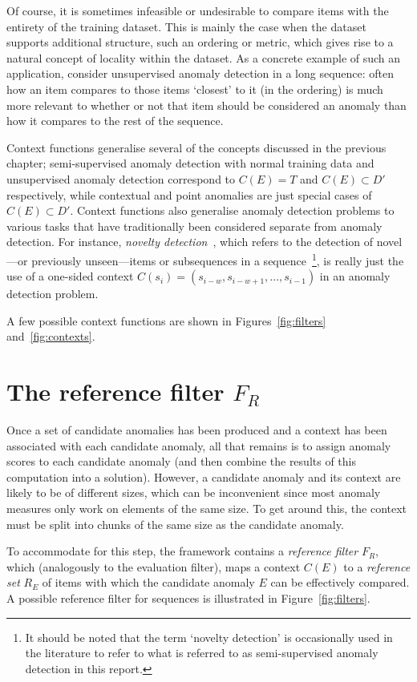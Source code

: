 Of course, it is sometimes infeasible or undesirable to compare items with the entirety of the training dataset. This is mainly the case when the dataset supports additional structure, such an ordering or metric, which gives rise to a natural concept of locality within the dataset. As a concrete example of such an application, consider unsupervised anomaly detection in a long sequence: often how an item compares to those items `closest' to it (in the ordering) is much more relevant to whether or not that item should be considered an anomaly than how it compares to the rest of the sequence.

Context functions generalise several of the concepts discussed in the previous chapter; semi-supervised anomaly detection with normal training data and unsupervised anomaly detection correspond to $C(E) = T$ and $C(E) \subset D'$ respectively, while contextual and point anomalies are just special cases of $C(E) \subset D'$. Context functions also generalise anomaly detection problems to various tasks that have traditionally been considered separate from anomaly detection. For instance, \emph{novelty detection}~\cite{chandola}, which refers to the detection of novel---or previously unseen---items or subsequences in a sequence~\footnote{It should be noted that the term `novelty detection' is occasionally used in the literature to refer to what is referred to as semi-supervised anomaly detection in this report.}, is really just the use of a one-sided context $C(s_i) = (s_{i-w}, s_{i - w + 1}, \dots, s_{i - 1})$ in an anomaly detection problem.

A few possible context functions are shown in Figures~\ref{fig:filters} and~\ref{fig:contexts}.

\section{The reference filter $F_R$}

Once a set of candidate anomalies has been produced and a context has been associated with each candidate anomaly, all that remains is to assign anomaly scores to each candidate anomaly (and then combine the results of this computation into a solution). However, a candidate anomaly and its context are likely to be of different sizes, which can be inconvenient since most anomaly measures only work on elements of the same size. To get around this, the context must be split into chunks of the same size as the candidate anomaly.

To accommodate for this step, the framework contains a \emph{reference filter} $F_R$, which (analogously to the evaluation filter), maps a context $C(E)$ to a \emph{reference set} $R_E$ of items with which the candidate anomaly $E$ can be effectively compared. A possible reference filter for sequences is illustrated in Figure~\ref{fig:filters}.

